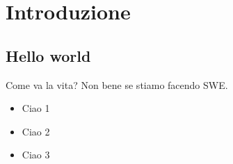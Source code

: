 \section{Introduzione}

\subsection{Hello world}

Come va la vita? Non bene se stiamo facendo SWE.

\begin{itemize}
	\item Ciao 1
	\item Ciao 2
	\item Ciao 3
\end{itemize}

\lipsum[3-5]